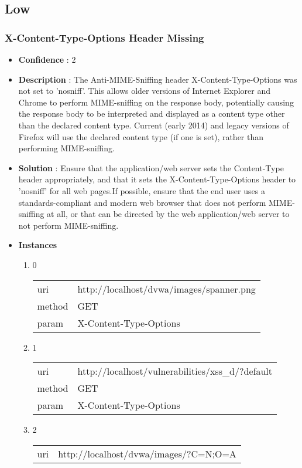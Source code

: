 \documentclass[10pt]{article}
\begin{document}
\subsection{Low}
\subsubsection{X-Content-Type-Options Header Missing}
\begin{itemize}
\item[] \textbf{Confidence} : 2
\item[] \textbf{Description} : The Anti-MIME-Sniffing header X-Content-Type-Options was not set to 'nosniff'. This allows older versions of Internet Explorer and Chrome to perform MIME-sniffing on the response body, potentially causing the response body to be interpreted and displayed as a content type other than the declared content type. Current (early 2014) and legacy versions of Firefox will use the declared content type (if one is set), rather than performing MIME-sniffing.
\item[] \textbf{Solution} :  Ensure that the application/web server sets the Content-Type header appropriately, and that it sets the X-Content-Type-Options header to 'nosniff' for all web pages.If possible, ensure that the end user uses a standards-compliant and modern web browser that does not perform MIME-sniffing at all, or that can be directed by the web application/web server to not perform MIME-sniffing.
\item[] \textbf{Instances}
\begin{enumerate}
\item[] 0
\begin{tabular}{| l | p{14cm}}
uri & http://localhost/dvwa/images/spanner.png \\
method & GET \\
param & X-Content-Type-Options \\
\end{tabular}
\item[] 1
\begin{tabular}{| l | p{14cm}}
uri & http://localhost/vulnerabilities/xss{\_}d/?default \\
method & GET \\
param & X-Content-Type-Options \\
\end{tabular}
\item[] 2
\begin{tabular}{| l | p{14cm}}
uri & http://localhost/dvwa/images/?C=N;O=A \\

\end{tabular}
\end{enumerate}
\end{itemize}
\end{document}
